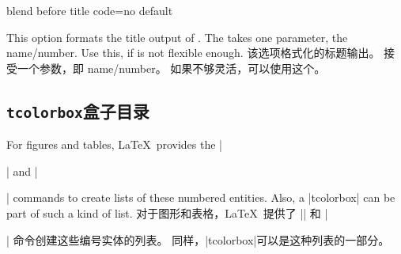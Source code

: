 \begin{docTcbKey}[][doc new=2015-03-13]{blend before title code}{=}{no default}
\begin{stripedbox}
This option formats the title output of .
The  takes one parameter, the name/number.
Use this, if  is not flexible enough.
\tcblower
该选项格式化的标题输出。%
接受一个参数，即 name/number。%
如果不够灵活，可以使用这个。
\end{stripedbox}

{\tcbusetemp}
\end{docTcbKey}

\subsection{\texttt{tcolorbox}盒子目录}\label{sec:listsof}
\begin{stripedbox}
For figures and tables, \LaTeX\ provides the |\listoffigures| and
|\listoftables| commands to create lists of these numbered entities.
Also, a |tcolorbox| can be part of such a kind of list.
\tcblower
对于图形和表格，\LaTeX\ 提供了 |\listfigures| 和 |\listoftables| 命令创建这些编号实体的列表。%
同样，|tcolorbox|可以是这种列表的一部分。
\end{stripedbox}

